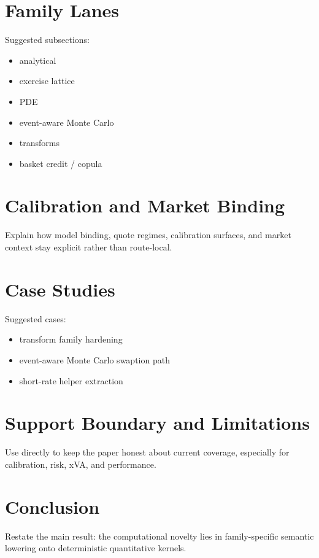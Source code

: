 \documentclass[11pt]{article}
\begin{document}
\section{Family Lanes}

Suggested subsections:
\begin{itemize}
    \item analytical
    \item exercise lattice
    \item PDE
    \item event-aware Monte Carlo
    \item transforms
    \item basket credit / copula
\end{itemize}

\section{Calibration and Market Binding}

Explain how model binding, quote regimes, calibration surfaces, and market
context stay explicit rather than route-local.

\section{Case Studies}

Suggested cases:
\begin{itemize}
    \item transform family hardening
    \item event-aware Monte Carlo swaption path
    \item short-rate helper extraction
\end{itemize}

\section{Support Boundary and Limitations}

Use  directly to keep the paper honest about current
coverage, especially for calibration, risk, xVA, and performance.

\section{Conclusion}

Restate the main result: the computational novelty lies in family-specific
semantic lowering onto deterministic quantitative kernels.
\end{document}
